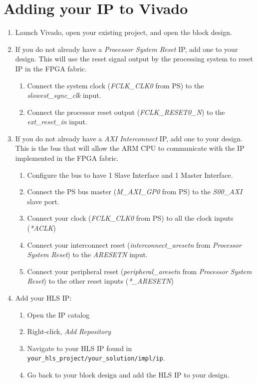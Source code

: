 \section{Adding your IP to Vivado}
\begin{enumerate}
	\item Launch Vivado, open your existing project, and open the block design.
	\item If you do not already have a \emph{Processor System Reset} IP, add one to your design.  This will use the reset signal output by the processing system to reset IP in the FPGA fabric.  
	
	\begin{enumerate}
		\item Connect the system clock (\emph{FCLK\_CLK0} from PS) to the \emph{slowest\_sync\_clk} input.
		\item Connect the processor reset output (\emph{FCLK\_RESET0\_N}) to the \emph{ext\_reset\_in} input.		
	\end{enumerate}
	\item If you do not already have a \emph{AXI Interconnect} IP, add one to your design.  This is the bus that will allow the ARM CPU to communicate with the IP implemented in the FPGA fabric.
	
	\begin{enumerate}
		\item Configure the bus to have 1 Slave Interface and 1 Master Interface.
		\item Connect the PS bus master (\emph{M\_AXI\_GP0} from PS) to the \emph{S00\_AXI} slave port.
		\item Connect your clock (\emph{FCLK\_CLK0} from PS) to all the clock inputs (\emph{*ACLK})
		\item Connect your interconnect reset (\emph{interconnect\_aresetn} from \emph{Processor System Reset}) to the \emph{ARESETN} input.
		\item Connect your peripheral reset (\emph{peripheral\_aresetn} from \emph{Processor System Reset}) to the other reset inputs (\emph{*\_ARESETN})
	\end{enumerate}


	\item {Add your HLS IP:}
	
	\begin{enumerate}
		\item Open the IP catalog
		\item Right-click, \emph{Add Repository}
		\item Navigate to your HLS IP found in \texttt{your\_hls\_project/your\_solution/impl/ip}.
		\item Go back to your block design and add the HLS IP to your design.
	\end{enumerate}
	

\end{enumerate}
